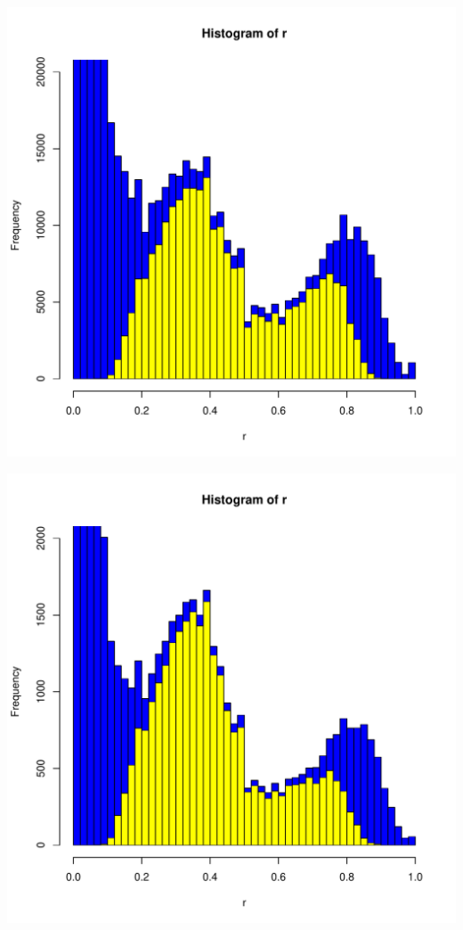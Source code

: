 \documentclass{article}\usepackage[]{graphicx}\usepackage[]{color}
\makeatletter
\def\maxwidth{ %
  \ifdim\Gin@nat@width>\linewidth
    \linewidth
  \else
    \Gin@nat@width
  \fi
}
\newenvironment{knitrout}{}{} %
\makeatother
\begin{document}
\begin{knitrout}
\includegraphics[width=\maxwidth]{FigS7-hwe-histo-figs-knitr/unnamed-chunk-12-2} 

\includegraphics[width=\maxwidth]{FigS7-hwe-histo-figs-knitr/unnamed-chunk-12-3} 


\end{knitrout}
\end{document}
